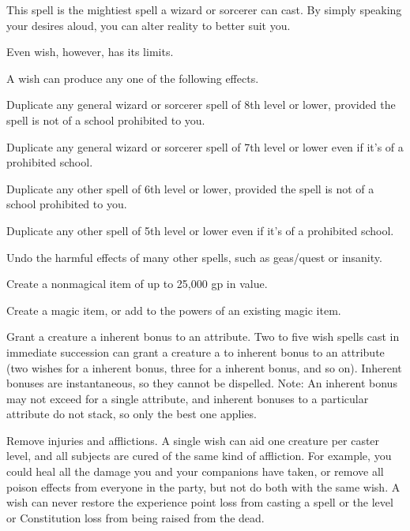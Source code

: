 \begin{spelleffect}
  This spell is the mightiest spell a wizard or sorcerer can cast. By simply speaking your desires aloud, you can alter reality to better suit you.
  \par Even wish, however, has its limits.
  \par A wish can produce any one of the following effects.
  \begin{itemize*}
    \item Duplicate any general wizard or sorcerer spell of 8th level or lower, provided the spell is not of a school prohibited to you.
    \item Duplicate any general wizard or sorcerer spell of 7th level or lower even if it's of a prohibited school.
    \item Duplicate any other spell of 6th level or lower, provided the spell is not of a school prohibited to you.
    \item Duplicate any other spell of 5th level or lower even if it's of a prohibited school. 
    \item Undo the harmful effects of many other spells, such as geas/quest or insanity.
    \item Create a nonmagical item of up to 25,000 gp in value.
    \item Create a magic item, or add to the powers of an existing magic item.
    \item Grant a creature a  inherent bonus to an attribute. Two to five wish spells cast in immediate succession can grant a creature a  to  inherent bonus to an attribute (two wishes for a  inherent bonus, three for a  inherent bonus, and so on). Inherent bonuses are instantaneous, so they cannot be dispelled. Note: An inherent bonus may not exceed  for a single attribute, and inherent bonuses to a particular attribute do not stack, so only the best one applies.
    \item Remove injuries and afflictions. A single wish can aid one creature per caster level, and all subjects are cured of the same kind of affliction. For example, you could heal all the damage you and your companions have taken, or remove all poison effects from everyone in the party, but not do both with the same wish. A wish can never restore the experience point loss from casting a spell or the level or Constitution loss from being raised from the dead.

\end{itemize*}
\end{spelleffect}
